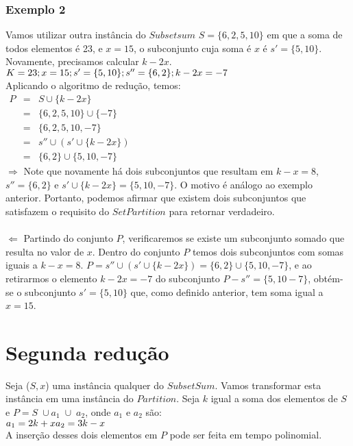 \documentclass[12pt]{article}
\begin{document}
\subsubsection{Exemplo 2}
Vamos utilizar outra instância do $Subsetsum$ $S = \{6,2,5,10\}$ em que a soma de todos elementos é 23, e $x = 15$, o subconjunto cuja soma é $x$ é $s' = \{5,10\}$. Novamente, precisamos calcular $k - 2x$.\\
$K = 23;\\x = 15;\\s' = \{5,10\};\\s'' = \{6,2\};\\k - 2x = -7$
\\
Aplicando o algoritmo de redução, temos:
\\
$\begin{matrix}
P &=& S \cup \{k-2x\}\\
\ &=& \{6,2,5,10\} \cup \{-7\}\\
\ &=& \{6,2,5,10,-7\}\\
\ &=& s'' \cup (s' \cup \{k-2x\})\\
\ &=& \{6,2\} \cup \{5,10,-7\}
\end{matrix}$
\\
\textbf{$\Rightarrow$} Note que novamente há dois subconjuntos que resultam em $k - x  = 8$, $s'' = \{6,2\}$ e $s' \cup \{k - 2x\} = \{5,10,-7\}$. O motivo é análogo ao exemplo anterior. Portanto, podemos afirmar que existem dois subconjuntos que satisfazem o requisito do $SetPartition$ para retornar verdadeiro.\\
\\
\textbf{$\Leftarrow$} Partindo do conjunto $P$, verificaremos se existe um subconjunto somado que resulta no valor de $x$. Dentro do conjunto $P$ temos dois subconjuntos com somas iguais a $k - x = 8$. $P = s'' \cup (s' \cup \{k - 2x\}) = \{6,2\} \cup \{5,10,-7\}$, e ao retirarmos o elemento $k - 2x = - 7$ do subconjunto $P - s'' = \{5,10-7\}$, obtém-se o subconjunto $s' = \{5,10\}$ que, como definido anterior, tem soma igual a $x = 15$.

\section{Segunda redução}

Seja ($S,x$) uma instância qualquer do $SubsetSum$. Vamos transformar esta instância em uma instância do $Partition$. Seja $k$ igual a soma dos elementos de $S$ e $P = S \;\cup a_1\; \cup\; a_2$, onde $a_1$ e $a_2$ são:\\
$a_1 = 2k + x \\a_2 = 3k - x$\\
A inserção desses dois elementos em $P$ pode ser feita em tempo polinomial.
\end{document}
